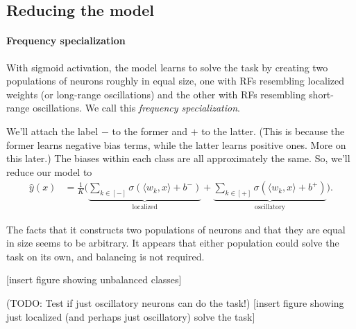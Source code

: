 \documentclass{article}
\begin{document}
\subsection*{Reducing the model}

\paragraph*{Frequency specialization}
With sigmoid activation, the model learns to solve the task by creating two populations of neurons roughly in equal size, one with RFs resembling localized weights (or long-range oscillations) and the other with RFs resembling short-range oscillations.
We call this \emph{frequency specialization}.

We'll attach the label $-$ to the former and $+$ to the latter.
(This is because the former learns negative bias terms, while the latter learns positive ones.
More on this later.)
The biases within each class are all approximately the same.
So, we'll reduce our model to
\begin{align}
  \hat{y}(x) &= \frac{1}{K} \bigg( \underbrace{ \sum_{k\in[-]} \sigma( \langle w_k, x \rangle + b^- ) }_\text{localized} + \underbrace{ \sum_{k\in[+]} \sigma( \langle w_k, x \rangle + b^+ ) }_\text{oscillatory} \bigg).
\end{align}

The facts that it constructs two populations of neurons and that they are equal in size seems to be arbitrary.
It appears that either population could solve the task on its own, and balancing is not required.

[insert figure showing unbalanced classes]

(TODO: Test if just oscillatory neurons can do the task!)
[insert figure showing just localized (and perhaps just oscillatory) solve the task]
\end{document}
